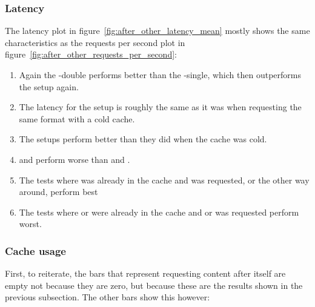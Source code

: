 \documentclass[twoside,openright]{uva-bachelor-thesis}
\begin{document}
\subsubsection{Latency}
The latency plot in figure~\ref{fig:after_other_latency_mean} mostly shows the
same characteristics as the requests per second plot in
figure~\ref{fig:after_other_requests_per_second}:
\begin{enumerate}
    \item
        Again the \lt-double performs better than the \lt-single, which then
        outperforms the \cdn setup again.

    \item
        The latency for the \cdn setup is roughly the same as it was when
        requesting the same format with a cold cache.

    \item
        The \lt setups perform better than they did when the cache was cold.

    \item
        \hds and \hls perform worse than \iss and \dash.

    \item
        The tests where \dash was already in the cache and \iss was requested,
        or the other way around, perform best

    \item
        The tests where \dash or \iss were already in the cache and \hls or \hds
        was requested perform worst.

\end{enumerate}


\FloatBarrier



\subsubsection{Cache usage}
First, to reiterate, the bars that represent requesting content after itself
are empty not because they are zero, but because these are the results shown in
the previous subsection. The other bars show this however:
\end{document}
